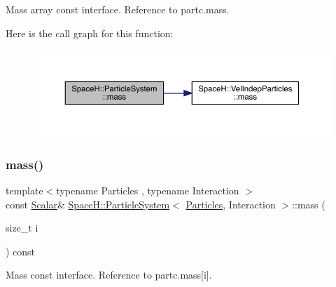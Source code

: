 Mass array const interface. Reference to partc.\+mass. 

Here is the call graph for this function\+:
\nopagebreak
\begin{figure}[H]
\begin{center}
\leavevmode
\includegraphics[width=350pt]{class_space_h_1_1_particle_system_aa639ed5d2edbbfd49964d012e1971807_cgraph}
\end{center}
\end{figure}
\mbox{\label{class_space_h_1_1_particle_system_a406f5aba5be8f379d0f1422997e9bf16}} 
\subsubsection{\texorpdfstring{mass()}{mass()}\hspace{0.1cm}{\footnotesize\ttfamily [2/2]}}
{\footnotesize\ttfamily template$<$typename Particles , typename Interaction $>$ \\
const \mbox{\hyperlink{class_space_h_1_1_particle_system_a522770dcfaf8b29aed35ea9348185a34}{Scalar}}\& \mbox{\hyperlink{class_space_h_1_1_particle_system}{Space\+H\+::\+Particle\+System}}$<$ \mbox{\hyperlink{struct_space_h_1_1_particles}{Particles}}, Interaction $>$\+::mass (\begin{DoxyParamCaption}\item[{size\+\_\+t}]{i }\end{DoxyParamCaption}) const\hspace{0.3cm}{\ttfamily [inline]}}



Mass const interface. Reference to partc.\+mass\mbox{[}i\mbox{]}. 

